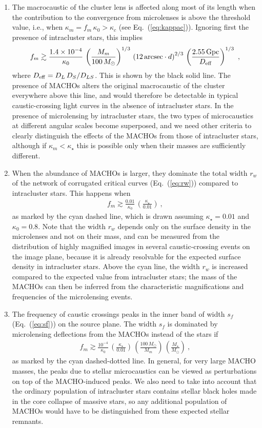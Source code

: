 \documentclass{aastex6}
\newcommand{\refeq}[1]{Eq.~(\ref{eq:#1})}
\newcommand{\ba}{\begin{eqnarray}}
\newcommand{\ea}{\end{eqnarray}}
\begin{document}
\begin{enumerate}

\item The macrocaustic of the cluster lens is affected along most of its
length when the contribution to the convergence from microlenses is
above the threshold value, i.e., when $\kappa_m = f_m\,\kappa_0 > \kappa_c$
(see \refeq{kappac}). Ignoring first the presence of intracluster stars,
this implies
\ba
f_m \gtrsim \frac{1.4 \times 10^{-4}}{\kappa_0}\,
\left( \frac{M_m}{100\,M_\odot} \right)^{1/3}\,
\left( 12\,{\rm arcsec}\cdot d \right)^{2/3}\,
\left( \frac{2.55\,{\rm Gpc}}{D_{\rm eff}} \right)^{1/3} ~,
\ea
where $D_{\rm eff} = D_L\,D_S/D_{LS}$. This is shown by the black solid
line. The presence of MACHOs alters the original macrocaustic of the
cluster everywhere above this line, and would therefore be detectable
in typical caustic-crossing light curves in the absence of
intracluster stars. In the presence of microlensing by intracluster
stars, the two types of microcaustics at different angular scales
become superposed, and we need other criteria to clearly distinguish the effects of the MACHOs from those of intracluster stars, although if $\kappa_m < \kappa_\star$ this is possible only when their masses are sufficiently different.

\item When the abundance of MACHOs is larger, they dominate the total width $r_w$ of the network of corrugated critical curves (\refeq{rw}) compared to intracluster stars. This happens when
\ba
f_m \gtrsim \frac{0.01}{\kappa_0}\,\left( \frac{\kappa_\star}{0.01} \right) ~ ,
\ea
as marked by the cyan dashed line, which is drawn assuming $\kappa_\star=0.01$ and $\kappa_0 = 0.8$.
Note that the width $r_w$ depends only on the surface density
in the microlenses and not on their mass, and can be measured from the distribution of highly magnified images in several caustic-crossing events on the image plane, because it is already resolvable for
the expected surface density in intracluster stars. Above the cyan
line, the width $r_w$ is increased compared to the expected value from
intracluster stars; the mass of the MACHOs can then be inferred from the
characteristic magnifications and frequencies of the microlensing
events.

\item The frequency of caustic crossings peaks in the inner band of width $s_f$ (\refeq{sf}) on the source plane. The width $s_f$ is dominated by microlensing deflections from the MACHOs instead of the stars if
\ba
f_m \gtrsim \frac{10^{-4}}{\kappa_0}\,
\left( \frac{\kappa_\star}{0.01} \right)\,
\left( \frac{100\,M_\odot}{M_m} \right)\,
\left( \frac{M_\star}{M_\odot} \right) ~,
\ea
as marked by the cyan dashed-dotted line. In general, for very large MACHO masses, the peaks due to stellar microcaustics can be viewed as perturbations on top of the MACHO-induced peaks. We also need to take into account that the ordinary population of intracluster stars contains stellar black holes made in the core collapse of massive stars, so any additional population of MACHOs would have to be distinguished from these expected stellar remnants.


\end{enumerate}
\end{document}
